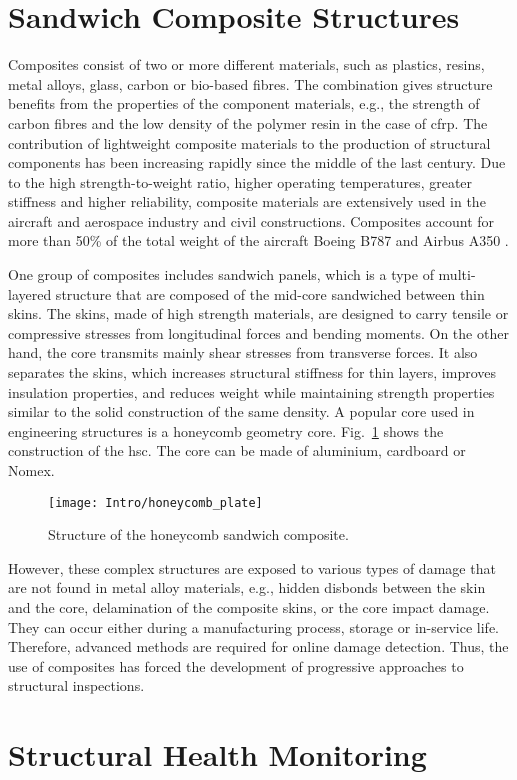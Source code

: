 \documentclass[11pt,a4paper,final]{report}
\begin{document}
\section{Sandwich Composite Structures}
\label{sec:scs}

Composites consist of two or more different materials, such as plastics, resins, metal alloys, glass, carbon or bio-based fibres. The combination gives  structure benefits from the properties of the component materials, e.g., the strength of carbon fibres and the low density of the polymer resin in the case of \ac{cfrp}.
The contribution of lightweight composite materials to the production of structural components has been increasing rapidly since the middle of the last century.
Due to the high strength-to-weight ratio, higher operating temperatures, greater stiffness and higher
reliability, composite materials are extensively used in the aircraft and aerospace industry and civil constructions.
Composites account for more than 50\% of the total weight of the aircraft Boeing B787 and Airbus A350 \cite{giurgiutiu2015structural}.

One group of composites includes sandwich panels, which is a type of multi-layered structure that are composed of the mid-core sandwiched between thin skins.
The skins, made of high strength materials, are designed to carry tensile or compressive stresses from longitudinal forces and bending moments.
On the other hand, the core transmits mainly shear stresses from transverse forces.
It also separates the skins, which increases structural stiffness for thin layers, improves insulation properties, and reduces weight while maintaining strength properties similar to the solid construction of the same density.
A popular core used in engineering structures is a honeycomb geometry core.
Fig.~\ref{fig:hcp} shows the construction of the \ac{hsc}.
The core can be made of aluminium, cardboard or Nomex. 
\begin{figure}[H] \begin{center}
		\texttt{[image: Intro/honeycomb\_plate]}
		\caption{
			\label{fig:hcp} Structure of the honeycomb sandwich composite.}
		\vspace{-0.5cm}
	\end{center}
\end{figure}

However, these complex structures are exposed to various types of damage that are not found in metal alloy materials, e.g., hidden disbonds between the skin and the core, delamination of the composite skins, or the core impact damage.
They can occur either during a manufacturing process, storage or in-service life.
Therefore, advanced methods are required for online damage detection.
Thus, the use of composites has forced the development of progressive approaches to structural inspections. \section{Structural Health Monitoring}
\label{sec:scm}
\end{document}
